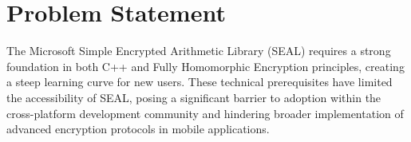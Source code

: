 \section{Problem Statement}
The Microsoft Simple Encrypted Arithmetic Library (SEAL) requires a strong foundation in both C++ and Fully Homomorphic Encryption principles, creating a steep learning curve for new users. These technical prerequisites have limited the accessibility of SEAL, posing a significant barrier to adoption within the cross-platform development community and hindering broader implementation of advanced encryption protocols in mobile applications.
